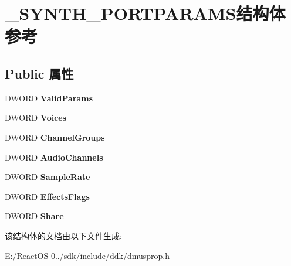 \hypertarget{struct___s_y_n_t_h___p_o_r_t_p_a_r_a_m_s}{}\section{\+\_\+\+S\+Y\+N\+T\+H\+\_\+\+P\+O\+R\+T\+P\+A\+R\+A\+M\+S结构体 参考}
\label{struct___s_y_n_t_h___p_o_r_t_p_a_r_a_m_s}
\subsection*{Public 属性}
\begin{DoxyCompactItemize}
\item 
\mbox{\label{struct___s_y_n_t_h___p_o_r_t_p_a_r_a_m_s_ac60128270d4c2d2c6a2410526ea487be}} 
D\+W\+O\+RD {\bfseries Valid\+Params}
\item 
\mbox{\label{struct___s_y_n_t_h___p_o_r_t_p_a_r_a_m_s_a35a6d876debe5adb4d0f8aa9a0f2da28}} 
D\+W\+O\+RD {\bfseries Voices}
\item 
\mbox{\label{struct___s_y_n_t_h___p_o_r_t_p_a_r_a_m_s_a16635b1e12c7855d278db24014559aa6}} 
D\+W\+O\+RD {\bfseries Channel\+Groups}
\item 
\mbox{\label{struct___s_y_n_t_h___p_o_r_t_p_a_r_a_m_s_a525abe993fe9f7d0e7b0b70dca8e7f90}} 
D\+W\+O\+RD {\bfseries Audio\+Channels}
\item 
\mbox{\label{struct___s_y_n_t_h___p_o_r_t_p_a_r_a_m_s_a31d31400d4c88905ad987f32fd6161d6}} 
D\+W\+O\+RD {\bfseries Sample\+Rate}
\item 
\mbox{\label{struct___s_y_n_t_h___p_o_r_t_p_a_r_a_m_s_a6f89f83ca40d2e80c7cc7b820996e1e8}} 
D\+W\+O\+RD {\bfseries Effects\+Flags}
\item 
\mbox{\label{struct___s_y_n_t_h___p_o_r_t_p_a_r_a_m_s_aa5a97cbed46c2f18d0b4efd77e659524}} 
D\+W\+O\+RD {\bfseries Share}
\end{DoxyCompactItemize}


该结构体的文档由以下文件生成\+:\begin{DoxyCompactItemize}
\item 
E\+:/\+React\+O\+S-\/0../sdk/include/ddk/dmusprop.\+h\end{DoxyCompactItemize}
